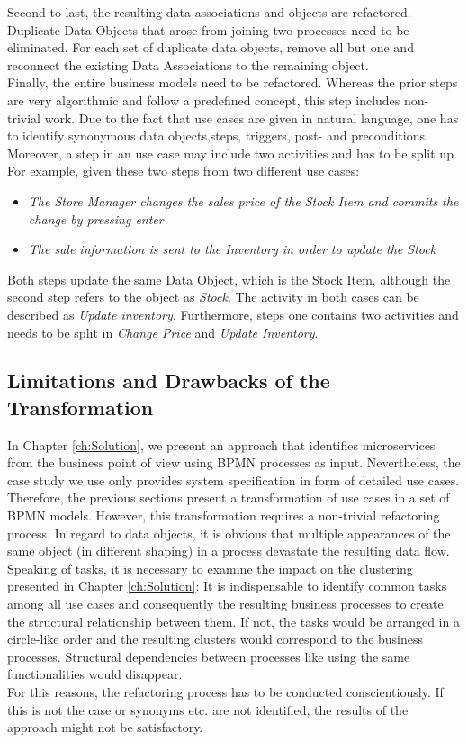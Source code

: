 Second to last, the resulting data associations and objects are refactored. Duplicate Data Objects that arose from joining two processes need to be eliminated. For each set of duplicate data objects, remove all but one and reconnect the existing Data Associations to the remaining object. \\
Finally, the entire business models need to be refactored. Whereas the prior steps are very algorithmic and follow a predefined concept, this step includes non-trivial work. Due to the fact that use cases are given in natural language, one has to identify synonymous data objects,steps, triggers, post- and preconditions. Moreover, a step in an use case may include two activities and has to be split up.
For example, given these two steps from two different use cases:
\begin{itemize}
	\item \textit{The Store Manager changes the sales price of the Stock Item and commits the change by pressing enter}
	\item \textit{The sale information is sent to the Inventory in order to update the Stock}
\end{itemize}
Both steps update the same Data Object, which is the Stock Item, although the second step refers to the object as \textit{Stock}. The activity in both cases can be described as \textit{Update inventory}. Furthermore, steps one contains two activities and needs to be split in \textit{Change Price} and \textit{Update Inventory}.

\subsection{Limitations and Drawbacks of the Transformation}
In Chapter \ref{ch:Solution}, we present an approach that identifies microservices from the business point of view using BPMN processes as input. Nevertheless, the case study we use only provides system specification in form of detailed use cases. Therefore, the previous sections present a transformation of use cases in a set of BPMN models. However, this transformation requires a non-trivial refactoring process. In regard to data objects, it is obvious that multiple appearances of the same object (in different shaping) in a process devastate the resulting data flow. Speaking of tasks, it is necessary to examine the impact on the clustering presented in Chapter \ref{ch:Solution}: It is indispensable to identify common tasks among all use cases and consequently the resulting business processes to create the structural relationship between them. If not, the tasks would be arranged in a circle-like order and the resulting clusters would correspond to the business processes. Structural dependencies between processes like using the same functionalities would disappear.\\
For this reasons, the refactoring process has to be conducted 
conscientiously. If this is not the case or synonyms etc. are not identified, the results of the approach might not be satisfactory.



